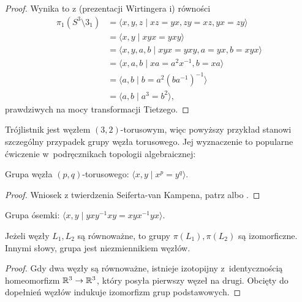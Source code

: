 \begin{proof}
    Wynika to z (prezentacji Wirtingera i) równości
    \begin{align}
        \pi_1(S^3 \setminus 3_1) & = \langle x, y, z \mid xz = yx, zy = xz, yx = zy \rangle \\
                                 & = \langle x, y \mid xyx = yxy \rangle \\
                                 & = \langle x, y, a, b \mid xyx = yxy, a = yx, b = xyx \rangle \\
                                 & = \langle x, a, b \mid xa = a^2x^{-1}, b = xa \rangle \\
                                 & = \langle a, b \mid b = a^2(ba^{-1})^{-1} \rangle \\
                                 & = \langle a, b \mid a^3 = b^2 \rangle,
    \end{align}
    prawdziwych na mocy transformacji Tietzego.
\end{proof}

Trójlistnik jest węzłem $(3, 2)$-torusowym, więc powyższy przykład stanowi szczególny przypadek grupy węzła torusowego.
Jej wyznaczenie to popularne ćwiczenie w~podręcznikach topologii algebraicznej:

\begin{example}
    Grupa węzła $(p,q)$-torusowego: $\langle x, y \mid x^p = y^q \rangle$.
\end{example}

\begin{proof}
    Wniosek z twierdzenia Seiferta-van Kampena, patrz \cite[s. 77]{kawauchi96} albo \cite[s. 47]{hatcher02}.
\end{proof}

\begin{example}
    Grupa ósemki: $\langle x, y \mid yxy^{{-1}}xy=xyx^{{-1}}yx \rangle$.
\end{example}

\begin{proposition}
    \label{prop:knot_group_invariant}
    Jeżeli węzły $L_1, L_2$ są równoważne, to grupy $\pi(L_1), \pi(L_2)$ są izomorficzne.
    Innymi słowy, grupa jest niezmiennikiem węzłów.
\end{proposition}

\begin{proof}
    Gdy dwa węzły są równoważne, istnieje izotopijny z~identycznością homeomorfizm $\mathbb R^3 \to \mathbb R^3$, który posyła pierwszy węzeł na drugi.
    Obcięty do dopełnień węzłów indukuje izomorfizm grup podstawowych.
\end{proof}

